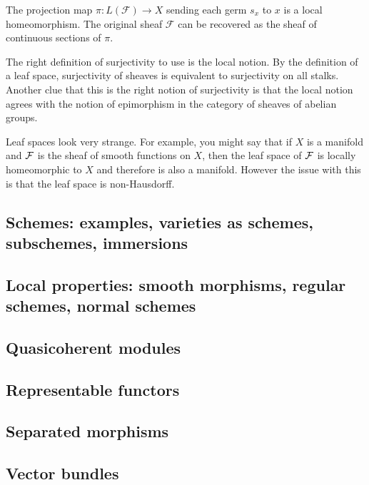 \documentclass[12pt]{article}
\begin{document}
    \begin{remark}
    The projection map $\pi: L(\mathcal{F}) \to X$ sending each germ $s_x$ to $x$ is a local homeomorphism. The original sheaf $\mathcal{F}$ can be recovered as the sheaf of continuous sections of $\pi$.
    \end{remark}



The right definition of surjectivity to use is the local notion. By the definition of a leaf space, surjectivity of sheaves is equivalent to surjectivity on all stalks. Another clue that this is the right notion of surjectivity is that the local notion agrees with the notion of epimorphism in the category of sheaves of abelian groups.

Leaf spaces look very strange. For example, you might say that if $X$ is a manifold and ${\mathcal{F}}$ is the sheaf of smooth functions on $X$, then the leaf space of ${\mathcal{F}}$ is locally homeomorphic to $X$ and therefore is also a manifold. However the issue with this is that the leaf space is non-Hausdorff.

\begin{example}
    
\end{example}




\subsection{Schemes: examples, varieties as schemes, subschemes, immersions}
\subsection{Local properties: smooth morphisms, regular schemes, normal schemes}
\subsection{Quasicoherent modules}
\subsection{Representable functors}
\subsection{Separated morphisms}
\subsection{Vector bundles}
\end{document}

